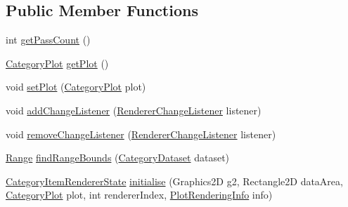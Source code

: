 \subsection*{Public Member Functions}
\begin{DoxyCompactItemize}
\item 
int \mbox{\hyperlink{interfaceorg_1_1jfree_1_1chart_1_1renderer_1_1category_1_1_category_item_renderer_aa8cd580a0e3836808f97f479f2c999bc}{get\+Pass\+Count}} ()
\item 
\mbox{\hyperlink{classorg_1_1jfree_1_1chart_1_1plot_1_1_category_plot}{Category\+Plot}} \mbox{\hyperlink{interfaceorg_1_1jfree_1_1chart_1_1renderer_1_1category_1_1_category_item_renderer_a4e97e71b2fb7754a580bf9c29312a9db}{get\+Plot}} ()
\item 
void \mbox{\hyperlink{interfaceorg_1_1jfree_1_1chart_1_1renderer_1_1category_1_1_category_item_renderer_a21871e4d309e252c004b96b93914bbc2}{set\+Plot}} (\mbox{\hyperlink{classorg_1_1jfree_1_1chart_1_1plot_1_1_category_plot}{Category\+Plot}} plot)
\item 
void \mbox{\hyperlink{interfaceorg_1_1jfree_1_1chart_1_1renderer_1_1category_1_1_category_item_renderer_af348fdca7f41a5ea21578021e28e9b49}{add\+Change\+Listener}} (\mbox{\hyperlink{interfaceorg_1_1jfree_1_1chart_1_1event_1_1_renderer_change_listener}{Renderer\+Change\+Listener}} listener)
\item 
void \mbox{\hyperlink{interfaceorg_1_1jfree_1_1chart_1_1renderer_1_1category_1_1_category_item_renderer_aa7c68a1fbbd3f35ec7bd5ee211811257}{remove\+Change\+Listener}} (\mbox{\hyperlink{interfaceorg_1_1jfree_1_1chart_1_1event_1_1_renderer_change_listener}{Renderer\+Change\+Listener}} listener)
\item 
\mbox{\hyperlink{classorg_1_1jfree_1_1data_1_1_range}{Range}} \mbox{\hyperlink{interfaceorg_1_1jfree_1_1chart_1_1renderer_1_1category_1_1_category_item_renderer_aa7294c25a26ffd1725d7920a6041a785}{find\+Range\+Bounds}} (\mbox{\hyperlink{interfaceorg_1_1jfree_1_1data_1_1category_1_1_category_dataset}{Category\+Dataset}} dataset)
\item 
\mbox{\hyperlink{classorg_1_1jfree_1_1chart_1_1renderer_1_1category_1_1_category_item_renderer_state}{Category\+Item\+Renderer\+State}} \mbox{\hyperlink{interfaceorg_1_1jfree_1_1chart_1_1renderer_1_1category_1_1_category_item_renderer_a35bcf49a6299b954e2215030f68ec59b}{initialise}} (Graphics2D g2, Rectangle2D data\+Area, \mbox{\hyperlink{classorg_1_1jfree_1_1chart_1_1plot_1_1_category_plot}{Category\+Plot}} plot, int renderer\+Index, \mbox{\hyperlink{classorg_1_1jfree_1_1chart_1_1plot_1_1_plot_rendering_info}{Plot\+Rendering\+Info}} info)

\end{DoxyCompactItemize}
